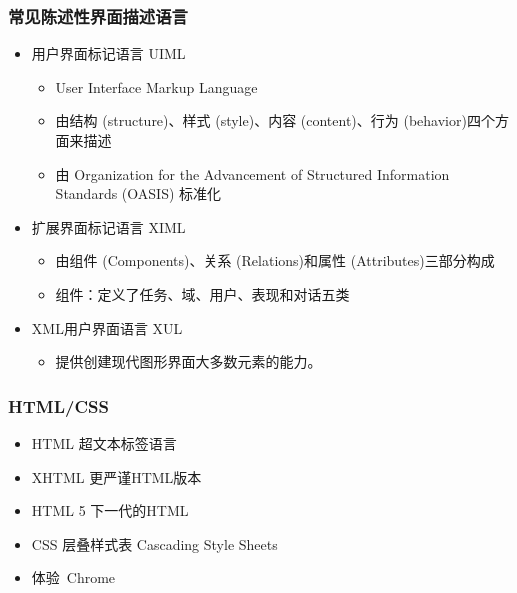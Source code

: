 \documentclass{beamer}
\begin{document}
\begin{frame}
	\frametitle{常见陈述性界面描述语言}
	\beamertemplatetransparentcovereddynamicmedium
	\begin{itemize}
		\item 用户界面标记语言 UIML
		\begin{itemize}
			\item User Interface Markup Language
			\item 由结构 (structure)、样式 (style)、内容 (content)、行为 (behavior)四个方面来描述~\cite{abrams1999uiml}
			\item 由 Organization for the Advancement of Structured Information Standards (OASIS) 标准化
		\end{itemize}
		\pause
		\item 扩展界面标记语言 XIML
		\begin{itemize}
			\item 由组件 (Components)、关系 (Relations)和属性 (Attributes)三部分构成
			\item 组件：定义了任务、域、用户、表现和对话五类
		\end{itemize}
		\pause
		\item XML用户界面语言 XUL
		\begin{itemize}
			\item 提供创建现代图形界面大多数元素的能力。
		\end{itemize}
	\end{itemize}
\end{frame}

\begin{frame}
	\frametitle{HTML/CSS}
	\beamertemplatetransparentcovereddynamicmedium
	\begin{itemize}
		\item HTML 超文本标签语言
	    \item XHTML 更严谨HTML版本
	    \item HTML 5 下一代的HTML
	    \item CSS 层叠样式表 Cascading Style Sheets
	    \pause
	    \item 体验~{\tiny Chrome}
	\end{itemize}
\end{frame}
\end{document}

